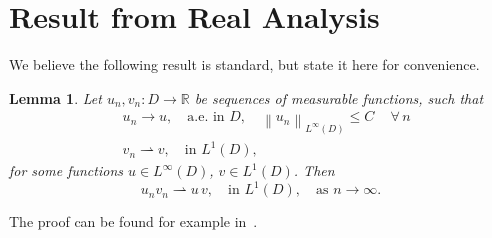 \documentclass[10pt,letterpaper,twoside]{amsart}
\newtheorem{lemma}{Lemma}[section]
\theoremstyle{definition}{\newtheorem{definition}[lemma]{Definition}}
\theoremstyle{note}{\newtheorem{claim}{Claim}[section]
\newtheorem*{claim*}{Claim}}
\numberwithin{equation}{section}
\newcommand{\dom}{D}
\newcommand{\norm}[1]{\left\| #1 \right\|}
\newcommand{\R}{\mathbb{R}}
\newcommand{\weak}{\rightharpoonup}
\begin{document}
\section{Result from Real Analysis}
We believe the following result is standard, but state it here for convenience.
\begin{lemma}\label{lem:kennethlemma}
	Let $u_n, v_n:\dom\to\R$ be sequences of measurable functions, such that
	\begin{align*}
	&u_n\rightarrow u,\quad \text{a.e. in } \dom, \quad \norm{u_n}_{L^\infty(\dom)}\leq C\, \quad\forall \, n\\
	&v_n\weak v,\quad \text{in } L^1(\dom), 
	\end{align*} 
	for some functions $u\in L^\infty(\dom)$, $v\in L^1(\dom)$. Then
	\begin{equation*}
	u_n v_n\rightharpoonup u\, v,\quad \text{in } L^1(\dom),\quad \text{as } n\rightarrow\infty.
	\end{equation*}
\end{lemma}
The proof can be found for example in~\cite[Lemma A.1]{efield}.



\end{document}
